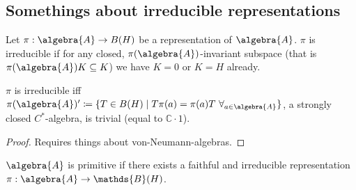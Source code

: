 \documentclass[a4paper]{article}
\begin{document}
\subsection{Somethings about irreducible representations}

Let $\pi: \algebra{A} \to B(H)$ be a representation of $\algebra{A}$.
$\pi$ is irreducible if for any closed, $\pi(\algebra{A})$-invariant subspace (that is $\pi(\algebra{A})K \subseteq K$) we have $K = 0$ or $K = H$ already.

\begin{lemma}[Schur]
	$\pi$ is irreducible iff $\pi(\algebra{A})' \coloneqq \{T \in B(H) \mid T \pi(a) = \pi(a) T \ \forall_{a \in \algebra{A}} \}$, a strongly closed $C^*$-algebra, is trivial (equal to $\mathds{C} \cdot 1$).
\end{lemma}

\begin{proof}
	Requires things about von-Neumann-algebras.
\end{proof}

\begin{exercise}[04-07]
	$\algebra{A}$ is primitive if there exists a faithful and irreducible representation $\pi: \algebra{A} \to \mathds{B}(H)$.
\end{exercise}
\end{document}
